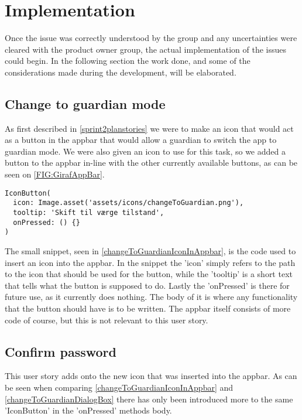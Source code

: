 \section{Implementation}
Once the issue was correctly understood by the group and any uncertainties were cleared with the product owner group, the actual implementation of the issues could begin. 
In the following section the work done, and some of the considerations made during the development, will be elaborated. 

\subsection{Change to guardian mode} \label{changeToGuardianIconImpl}
As first described in \autoref{sprint2planstories} we were to make an icon that would act as a button in the appbar that would allow a guardian to switch the app to guardian mode.
We were also given an icon to use for this task, so we added a button to the appbar in-line with the other currently available buttons, as can be seen on \autoref{FIG:GirafAppBar}.


\begin{lstlisting}[caption={The code used to insert the change to guardian icon in the appbar}, captionpos=b, label=changeToGuardianIconInAppbar]
IconButton(
  icon: Image.asset('assets/icons/changeToGuardian.png'),
  tooltip: 'Skift til værge tilstand',
  onPressed: () {}
)
\end{lstlisting}

The small snippet, seen in \autoref{changeToGuardianIconInAppbar}, is the code used to insert an icon into the appbar.
In the snippet the 'icon' simply refers to the path to the icon that should be used for the button, while the 'tooltip' is a short text that tells what the button is supposed to do.
Lastly the 'onPressed' is there for future use, as it currently does nothing.
The body of it is where any functionality that the button should have is to be written.
The appbar itself consists of more code of course, but this is not relevant to this user story.

\subsection{Confirm password} \label{changeToGuardianDialogBoxImpl}
This user story adds onto the new icon that was inserted into the appbar.
As can be seen when comparing \autoref{changeToGuardianIconInAppbar} and \autoref{changeToGuardianDialogBox} there has only been introduced more to the same 'IconButton' in the 'onPressed' methods body.

